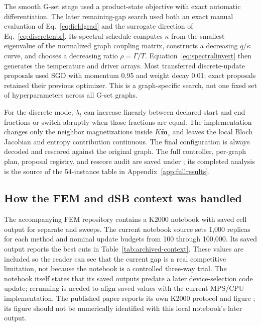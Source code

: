 The smooth G-set stage used a product-state objective with exact
automatic differentiation. The later remaining-gap search used both
an exact manual evaluation of Eq.~\eqref{eq:fieldgrad} and the
surrogate direction of Eq.~\eqref{eq:discretenbr}. Its spectral schedule
computes $\kappa$ from the smallest eigenvalue of the normalized graph
coupling matrix, constructs a decreasing $q/\kappa$ curve, and chooses a
decreasing ratio $\rho=\Gamma/T$. Equation~\eqref{eq:spectralinvert}
then generates the temperature and driver arrays. Most transferred
discrete-update proposals used SGD with momentum 0.95 and weight decay
0.01; exact proposals retained their previous optimizer. This is a
graph-specific search, not one fixed set of hyperparameters across
all G-set graphs.

For the discrete mode, $\lambda_t$ can increase linearly between
declared start and end fractions or switch abruptly when those
fractions are equal. The implementation changes only the neighbor
magnetizations inside $K\widetilde{\bm m}_z$ and leaves the local
Bloch Jacobian and entropy contribution continuous. The final
configuration is always decoded and rescored against the original
graph. The full controller, per-graph plan, proposal registry, and
rescore audit are saved under
; its completed
analysis is the source of the 54-instance table in
Appendix~\ref{app:fullresults}.

\subsection{How the FEM and dSB context was handled}

The accompanying FEM repository contains a K2000 notebook with saved
cell output for separate \FEM{} and \dSB{} sweeps. The current notebook
source sets 1,000 replicas for each method and nominal update budgets
from 100 through 100,000. Its saved output reports the best cuts in
Table~\ref{tab:archived-context}. These values are included so the
reader can see that the current \QeFEM{} gap is a real competitive
limitation, not because the notebook is a controlled three-way trial.
The notebook itself states that its saved outputs predate a later
device-selection code update; rerunning is needed to align saved
values with the current MPS/CPU implementation. The published \FEM{}
paper reports its own K2000 protocol and figure
\citep{shen2025}; its figure should not be numerically identified with
this local notebook's later output.


